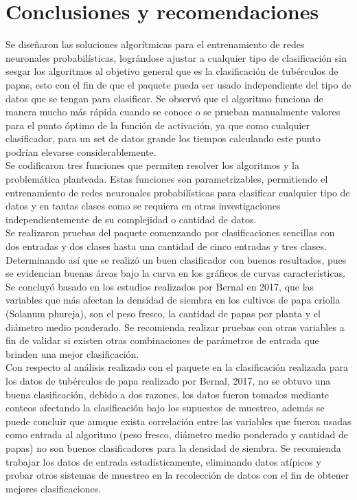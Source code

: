 \chapter{Conclusiones y recomendaciones}

	Se diseñaron las soluciones algorítmicas para el entrenamiento de redes neuronales probabilísticas, lográndose ajustar a cualquier tipo de clasificación sin sesgar los algoritmos al objetivo general que es la clasificación de tubérculos de papas, esto con el fin de que el paquete pueda ser usado independiente del tipo de datos que se tengan para clasificar. Se observó que el algoritmo funciona de manera mucho más rápida cuando se conoce o se prueban manualmente valores para el punto óptimo de la función de activación, ya que como cualquier clasificador, para un set de datos grande los tiempos calculando este punto podrían elevarse considerablemente.\\

Se codificaron tres funciones que permiten resolver los algoritmos y la problemática planteada. Estas funciones son parametrizables, permitiendo el entrenamiento de redes neuronales probabilísticas para clasificar cualquier tipo de datos y en tantas clases como se requiera en otras investigaciones independientemente de su complejidad o cantidad de datos. \\

Se realizaron pruebas del paquete comenzando por clasificaciones sencillas con dos entradas y dos clases hasta una cantidad de cinco entradas y tres clases. Determinando así que se realizó un buen clasificador con buenos resultados, pues se evidencian buenas áreas bajo la curva en los gráficos de curvas características. \\

Se concluyó basado en los estudios realizados por Bernal en 2017, que las variables que más afectan la densidad de siembra en los cultivos de papa criolla (Solanum phureja), son el peso fresco, la cantidad de papas por planta y el diámetro medio ponderado. Se recomienda realizar pruebas con otras variables a fin de validar si existen otras combinaciones de parámetros de entrada que brinden una mejor clasificación.\\

Con respecto al análisis realizado con el paquete en la clasificación realizada para los datos de tubérculos de papa realizado por Bernal, 2017, no se obtuvo una buena clasificación, debido a dos razones, los datos fueron tomados mediante conteos afectando la clasificación bajo los supuestos de muestreo, además se puede concluir que aunque exista correlación entre las variables que fueron usadas como entrada al algoritmo (peso fresco, diámetro medio ponderado y cantidad de papas) no son buenos clasificadores para la densidad de siembra. Se recomienda trabajar los datos de entrada estadísticamente, eliminando datos atípicos y probar otros sistemas de muestreo en la recolección de datos con el fin de obtener mejores clasificaciones.\\

